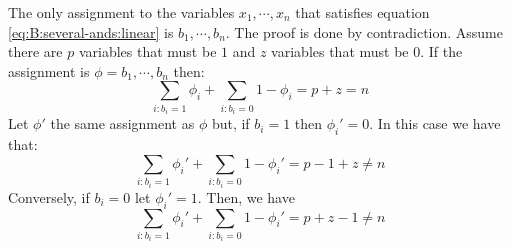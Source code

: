 \hfill

The only assignment to the variables $x_1,\cdots,x_n$ that satisfies equation
\ref{eq:B:several-ands:linear} is $b_1,\cdots,b_n$. The proof is done by contradiction.
Assume there are $p$ variables that must be $1$ and $z$ variables that must be $0$.
If the assignment is $\phi=b_1,\cdots,b_n$ then:
\[
\sum_{i : b_i=1} \phi_i + \sum_{i : b_i=0} 1 - \phi_i = p + z = n
\]
Let $\phi'$ the same assignment as $\phi$ but, if $b_i=1$ then $\phi_i'=0$.
In this case we have that:
\[
\sum_{i : b_i=1} \phi_i' + \sum_{i : b_i=0} 1 - \phi_i' = p - 1 + z \neq n
\]
Conversely, if $b_i=0$ let $\phi_i'=1$. Then, we have
\[
\sum_{i : b_i=1} \phi_i' + \sum_{i : b_i=0} 1 - \phi_i' = p + z - 1 \neq n
\]
